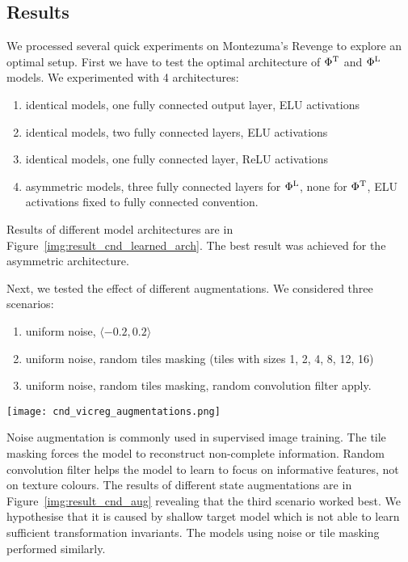 \documentclass[a4paper,11pt]{elsarticle}
\begin{document}
\subsection{Results}

We processed several quick experiments on Montezuma's Revenge to explore an optimal setup.
First we have to test the optimal architecture of $\Phi^{\rm T}$ and $\Phi^{\rm L}$ models. 
We experimented with 4 architectures: 
\begin{enumerate}
    \item identical models, one fully connected output layer, ELU activations
    \item identical models, two fully connected layers, ELU activations
    \item identical models, one fully connected layer, ReLU activations
    \item asymmetric models, three fully connected layers for $\Phi^{\rm L}$, none for $\Phi^{\rm T}$, ELU activations fixed to fully connected convention.
\end{enumerate}
Results of different model architectures are in Figure~\ref{img:result_cnd_learned_arch}. The best result was achieved for the asymmetric architecture.

Next, we tested the effect of different augmentations. We considered three scenarios: 
\begin{enumerate}
    \item uniform noise, $\langle -0.2, 0.2 \rangle$
    \item uniform noise, random tiles masking (tiles with sizes 1, 2, 4, 8, 12, 16)
    \item uniform noise,  random tiles masking, random convolution filter apply.
\end{enumerate}

\begin{figure*}[t!]
\centering
\texttt{[image: cnd\_vicreg\_augmentations.png]}
\caption{Agent performance for different state augmentations, evaluated in terms of the overall score, external reward obtained and the number of rooms explored.}
\label{img:result_cnd_aug}
\end{figure*}

Noise augmentation is commonly used in supervised image training. The tile masking
forces the model to reconstruct non-complete information. Random convolution filter
helps the model to learn to focus on informative features, not on texture colours. The results of different state augmentations are in Figure~\ref{img:result_cnd_aug} revealing that the third scenario worked best. We hypothesise that it is caused by shallow target model which is not able to learn sufficient transformation invariants. The models using noise or tile masking performed similarly.
\end{document}
